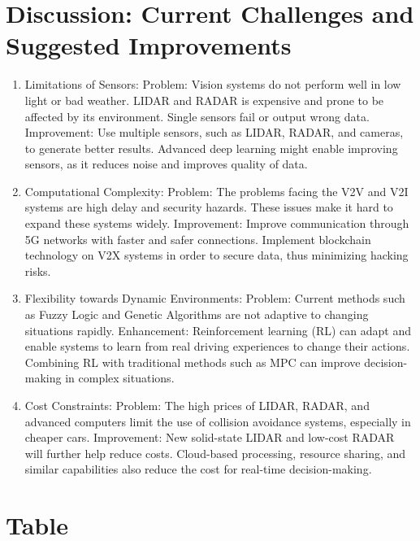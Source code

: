 \documentclass[12pt,twocolumn]{article}
\begin{document}
\section{Discussion: Current Challenges and Suggested Improvements}
\begin{enumerate}
\item Limitations of Sensors:
Problem:
Vision systems do not perform well in low light or bad weather.
LIDAR and RADAR is expensive and prone to be affected by its environment.
Single sensors fail or output wrong data.
Improvement:
Use multiple sensors, such as LIDAR, RADAR, and cameras, to generate better results.
Advanced deep learning might enable improving sensors, as it reduces noise and improves quality of data.

\item Computational Complexity:
Problem:
The problems facing the V2V and V2I systems are high delay and security hazards.
These issues make it hard to expand these systems widely.
Improvement:
Improve communication through 5G networks with faster and safer connections.
Implement blockchain technology on V2X systems in order to secure data, thus minimizing hacking risks.

\item Flexibility towards Dynamic Environments:
Problem:
Current methods such as Fuzzy Logic and Genetic Algorithms are not adaptive to changing situations rapidly.
Enhancement:
Reinforcement learning (RL) can adapt and enable systems to learn from real driving experiences to change their actions.
Combining RL with traditional methods such as MPC can improve decision-making in complex situations.
\item Cost Constraints:
Problem:
The high prices of LIDAR, RADAR, and advanced computers limit the use of collision avoidance systems, especially in cheaper cars.
Improvement:
New solid-state LIDAR and low-cost RADAR will further help reduce costs.
Cloud-based processing, resource sharing, and similar capabilities also reduce the cost for real-time decision-making.
\end{enumerate}
\section{Table}
\end{document}
